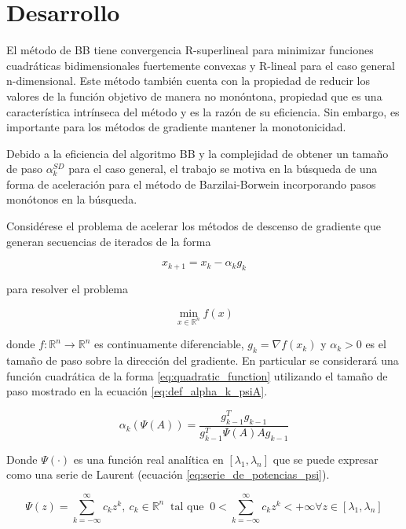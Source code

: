 
\section*{Desarrollo}

El método de BB tiene convergencia R-superlineal para minimizar funciones cuadráticas bidimensionales fuertemente convexas y R-lineal para el caso general n-dimensional\cite{Fletcher_2005}. Este método también cuenta con la propiedad de reducir los valores de la función objetivo de manera no monóntona, propiedad que es una característica intrínseca del método y es la razón de su eficiencia. Sin embargo, es importante para los métodos de gradiente mantener la monotonicidad.
\par Debido a la eficiencia del algoritmo BB y la complejidad de obtener un tamaño de paso $\alpha_k^{SD}$ para el caso general, el trabajo se motiva en la búsqueda de una forma de aceleración para el método de Barzilai-Borwein incorporando pasos monótonos en la búsqueda. \par Considérese el problema de acelerar los métodos de descenso de gradiente que generan secuencias de iterados de la forma

\begin{equation*}
    x_{k+1} = x_k - \alpha_k g_k
\end{equation*}

para resolver el problema

\begin{equation*}
    \min_{x\in\mathbb{R}^n}f(x)
\end{equation*}

donde $f:\mathbb{R}^n \rightarrow \mathbb{R}^n$ es continuamente diferenciable, $g_k=\nabla f(x_k)$ y $\alpha_k>0$ es el tamaño de paso sobre la dirección del gradiente. En particular se considerará una función cuadrática de la forma \ref{eq:quadratic_function} utilizando el tamaño de paso mostrado en la ecuación \ref{eq:def_alpha_k_psiA}.

\begin{equation}
    \alpha_k(\Psi(A)) = \frac{g_{k-1}^Tg_{k-1}}{g^T_{k-1}\Psi(A)Ag_{k-1}} \label{eq:def_alpha_k_psiA}
\end{equation}

Donde $\Psi(\cdot)$ es una función real analítica en $[\lambda_1, \lambda_n]$ que se puede expresar como una serie de Laurent (ecuación \ref{eq:serie_de_potencias_psi}).

\begin{equation}
    \Psi(z) = \sum\limits_{k=-\infty}^{\infty} c_kz^k,\ c_k\in \mathbb{R}^n  \;\; \text{tal que} \;\; 0<\sum_{k =- \infty}^{\infty}c_k z^k<+\infty \forall z \in[\lambda_1,  \lambda_n]  \label{eq:serie_de_potencias_psi}
\end{equation}

